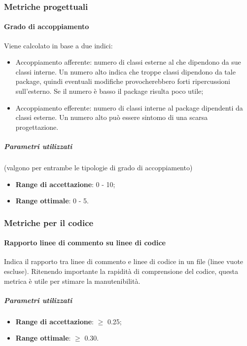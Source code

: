 \documentclass[../PianoDiQualifica.tex]{subfiles}
\begin{document}
			\subsubsection{Metriche progettuali}\label{MetricheProgettuali}
				\paragraph{Grado di accoppiamento\\}
					Viene calcolato in base a due indici:
					\begin{itemize}
						\item Accoppiamento afferente: numero di classi esterne
						al  che dipendono da sue classi interne. Un numero
						alto indica che troppe classi dipendono da tale package, quindi
						eventuali modifiche provocherebbero forti ripercussioni
						sull'esterno. Se il numero è basso il package risulta poco
						utile;
						\item Accoppiamento efferente: numero di classi interne
						al package dipendenti da classi esterne. Un numero alto può
						essere sintomo di una scarsa progettazione.
					\end{itemize}
					\subparagraph{Parametri utilizzati}
						(valgono per entrambe le tipologie di grado di accoppiamento)
						\begin{itemize}
							\item \textbf{Range di accettazione}: 0 - 10;
							\item \textbf{Range ottimale}: 0 - 5.
						\end{itemize}
			\subsubsection{Metriche per il codice}\label{MetrichePerIlCodice}
				\paragraph{Rapporto linee di commento su linee di codice\\}
					Indica il rapporto tra linee di commento e linee di codice in un
					file (linee vuote escluse). Ritenendo importante la rapidità di
					comprensione del codice, questa metrica è utile per stimare la
					manutenibilità.
					\subparagraph{Parametri utilizzati}
						\begin{itemize}
							\item \textbf{Range di accettazione}: $\geq$ 0.25;
							\item \textbf{Range ottimale}: $\geq$ 0.30.
						\end{itemize}
\end{document}
